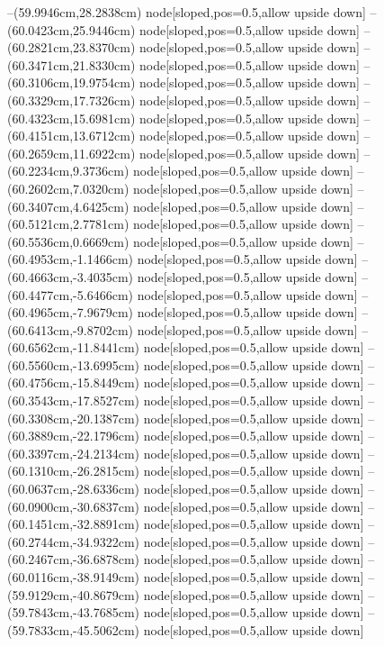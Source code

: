 --(59.9946cm,28.2838cm) node[sloped,pos=0.5,allow upside down]{\ArrowIn}
--(60.0423cm,25.9446cm) node[sloped,pos=0.5,allow upside down]{\ArrowIn}
--(60.2821cm,23.8370cm) node[sloped,pos=0.5,allow upside down]{\ArrowIn}
--(60.3471cm,21.8330cm) node[sloped,pos=0.5,allow upside down]{\ArrowIn}
--(60.3106cm,19.9754cm) node[sloped,pos=0.5,allow upside down]{\ArrowIn}
--(60.3329cm,17.7326cm) node[sloped,pos=0.5,allow upside down]{\ArrowIn}
--(60.4323cm,15.6981cm) node[sloped,pos=0.5,allow upside down]{\ArrowIn}
--(60.4151cm,13.6712cm) node[sloped,pos=0.5,allow upside down]{\ArrowIn}
--(60.2659cm,11.6922cm) node[sloped,pos=0.5,allow upside down]{\ArrowIn}
--(60.2234cm,9.3736cm) node[sloped,pos=0.5,allow upside down]{\ArrowIn}
--(60.2602cm,7.0320cm) node[sloped,pos=0.5,allow upside down]{\ArrowIn}
--(60.3407cm,4.6425cm) node[sloped,pos=0.5,allow upside down]{\ArrowIn}
--(60.5121cm,2.7781cm) node[sloped,pos=0.5,allow upside down]{\ArrowIn}
--(60.5536cm,0.6669cm) node[sloped,pos=0.5,allow upside down]{\ArrowIn}
--(60.4953cm,-1.1466cm) node[sloped,pos=0.5,allow upside down]{\ArrowIn}
--(60.4663cm,-3.4035cm) node[sloped,pos=0.5,allow upside down]{\ArrowIn}
--(60.4477cm,-5.6466cm) node[sloped,pos=0.5,allow upside down]{\ArrowIn}
--(60.4965cm,-7.9679cm) node[sloped,pos=0.5,allow upside down]{\ArrowIn}
--(60.6413cm,-9.8702cm) node[sloped,pos=0.5,allow upside down]{\ArrowIn}
--(60.6562cm,-11.8441cm) node[sloped,pos=0.5,allow upside down]{\ArrowIn}
--(60.5560cm,-13.6995cm) node[sloped,pos=0.5,allow upside down]{\ArrowIn}
--(60.4756cm,-15.8449cm) node[sloped,pos=0.5,allow upside down]{\ArrowIn}
--(60.3543cm,-17.8527cm) node[sloped,pos=0.5,allow upside down]{\ArrowIn}
--(60.3308cm,-20.1387cm) node[sloped,pos=0.5,allow upside down]{\ArrowIn}
--(60.3889cm,-22.1796cm) node[sloped,pos=0.5,allow upside down]{\ArrowIn}
--(60.3397cm,-24.2134cm) node[sloped,pos=0.5,allow upside down]{\ArrowIn}
--(60.1310cm,-26.2815cm) node[sloped,pos=0.5,allow upside down]{\ArrowIn}
--(60.0637cm,-28.6336cm) node[sloped,pos=0.5,allow upside down]{\ArrowIn}
--(60.0900cm,-30.6837cm) node[sloped,pos=0.5,allow upside down]{\ArrowIn}
--(60.1451cm,-32.8891cm) node[sloped,pos=0.5,allow upside down]{\ArrowIn}
--(60.2744cm,-34.9322cm) node[sloped,pos=0.5,allow upside down]{\ArrowIn}
--(60.2467cm,-36.6878cm) node[sloped,pos=0.5,allow upside down]{\ArrowIn}
--(60.0116cm,-38.9149cm) node[sloped,pos=0.5,allow upside down]{\ArrowIn}
--(59.9129cm,-40.8679cm) node[sloped,pos=0.5,allow upside down]{\ArrowIn}
--(59.7843cm,-43.7685cm) node[sloped,pos=0.5,allow upside down]{\ArrowIn}
--(59.7833cm,-45.5062cm) node[sloped,pos=0.5,allow upside down]{\ArrowIn}
